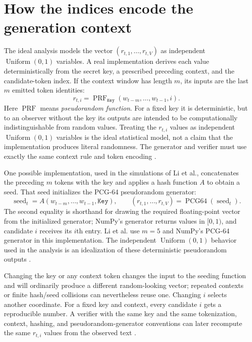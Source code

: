 \documentclass[11pt]{article}
\DeclareRobustCommand{\iperpaper}[2]{%
  \begingroup
  \hypersetup{pdfborder=0 0 0}%
  \href{iperpaper:#1}{{\color{iperpaperlink}#2}}%
  \endgroup
}
\def\iperpaper#1#2{#2}%
\newcommand{\U}{\operatorname{Uniform}}
\newcommand{\Key}{\mathtt{Key}}
\newcommand{\PRF}{\operatorname{PRF}}
\begin{document}
\section{How the indices encode the generation context}
The ideal analysis models the vector $(r_{t,1},\ldots,r_{t,V})$ as independent $\iperpaper{uniform_ideal_model}{\U(0,1)}$ variables. A real implementation derives each value deterministically from the secret key, a prescribed preceding context, and the candidate-token index. If the context window has length $m$, its inputs are the last $m$ emitted token identities:
\[
  r_{t,i}=\iperpaper{keyed_prf}{\PRF_{\Key}(w_{t-m},\ldots,w_{t-1},i)}.
\]
Here \(\iperpaper{prf_symbol}{\PRF}\) means \emph{\iperpaper{prf_concept}{pseudorandom function}}. For a fixed key it is deterministic, but to an observer without the key its outputs are intended to be computationally indistinguishable from random values. Treating the $r_{t,i}$ values as independent $\iperpaper{uniform_symbol}{\U}(0,1)$ variables is the ideal statistical model, not a claim that the implementation produces literal randomness.
The generator and verifier must use exactly the same context rule and token encoding \cite{li2025}.

One possible implementation, used in the simulations of Li et al., concatenates
the preceding $m$ tokens with the key and applies a hash function $A$ to obtain a
seed. That seed initializes the \iperpaper{pcg64_name}{PCG-64} pseudorandom generator:
\[
  \operatorname{seed}_t
  =A(w_{t-m},\ldots,w_{t-1},\Key),
  \qquad
  (r_{t,1},\ldots,r_{t,V})
  =\iperpaper{pcg64_symbol}{\operatorname{PCG64}}(\operatorname{seed}_t).
\]
The second equality is shorthand for drawing the required floating-point vector from
the initialized generator; NumPy's generator returns values in $[0,1)$, and candidate $i$ receives its $i$th entry.
Li et al. use $m=5$ and NumPy's \iperpaper{pcg64_name}{PCG-64} generator in this implementation. The
independent $\iperpaper{uniform_symbol}{\U}(0,1)$ behavior used in the analysis is an idealization of these
deterministic pseudorandom outputs \cite{li2025}.

Changing the key or any context token changes the input to the seeding function and will ordinarily produce a different random-looking vector; repeated contexts or finite hash/seed collisions can nevertheless reuse one. Changing $i$ selects another coordinate. For a fixed key and context, every candidate $i$ gets a reproducible number. A verifier with the same key and the same tokenization, context, hashing, and pseudorandom-generator conventions can later recompute the same $r_{t,i}$ values from the observed text \cite{aaronson2022,li2025}.
\end{document}
